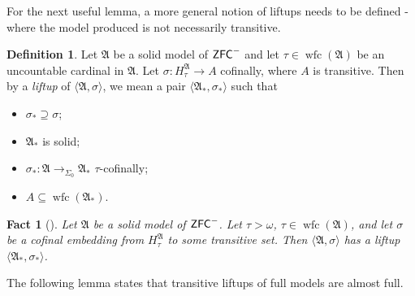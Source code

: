 \documentclass{amsart}
\newtheorem{fact}[theorem]{Fact}
\theoremstyle{definition}
\newtheorem{definition}[theorem]{Definition}
\theoremstyle{remark}
\newcommand{\ZFC}{\textup{\ensuremath{\textsf{ZFC}}}}
\DeclareMathOperator{\wfc}{wfc}
\newcommand{\To}{\longrightarrow}
\begin{document}
For the next useful lemma, a more general notion of liftups needs to be defined - where the model produced is not necessarily transitive.
\begin{definition} Let $\mathfrak A$ be a solid model of $\ZFC^-$ and let $\tau \in \wfc(\mathfrak A)$ be an uncountable cardinal in $\mathfrak A$. Let $\sigma : H_{\tau}^\mathfrak A \To A$ cofinally, where $A$ is transitive. Then by a \textit{liftup} of $\langle \mathfrak A, \sigma\rangle$, we mean a pair $\langle {\mathfrak A}_*, \sigma_* \rangle$ such that 
\begin{itemize}
	\item $\sigma_* \supseteq \sigma$;
	\item ${\mathfrak A}_*$ is solid;
	\item $\sigma_*: \mathfrak A \To_{\Sigma_0} {\mathfrak A}_*$ $\tau$-cofinally;
	\item $A \subseteq \wfc({\mathfrak A}_*)$. \qedhere
\end{itemize}
\end{definition}
\begin{fact}[{\cite[Lemma 3.3]{Jensen:2014}}]\label{fact:solidliftup} Let $\mathfrak A$ be a solid model of $\ZFC^-$. Let $\tau > \omega$, $\tau \in \wfc(\mathfrak A)$, and let $\sigma$ be a cofinal embedding from $H_{\tau}^{\mathfrak A}$ to some transitive set. Then $\langle \mathfrak A, \sigma \rangle$ has a liftup $\langle \mathfrak A_*, \sigma_* \rangle$.
\end{fact}

The following lemma states that transitive liftups of full models are almost full.
\end{document}
